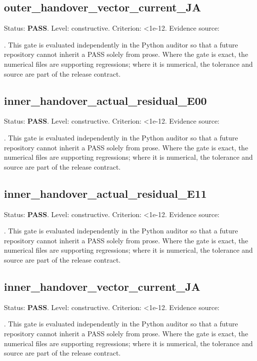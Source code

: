 \documentclass[11pt,a4paper,oneside]{book}
\begin{document}
\subsection{outer\_handover\_vector\_current\_JA}
Status: \textbf{PASS}. Level: constructive. Criterion: <1e-12. Evidence source:\par\noindent{}. This gate is evaluated independently in the Python auditor so that a future repository cannot inherit a PASS solely from prose. Where the gate is exact, the numerical files are supporting regressions; where it is numerical, the tolerance and source are part of the release contract.\par

\subsection{inner\_handover\_actual\_residual\_E00}
Status: \textbf{PASS}. Level: constructive. Criterion: <1e-12. Evidence source:\par\noindent{}. This gate is evaluated independently in the Python auditor so that a future repository cannot inherit a PASS solely from prose. Where the gate is exact, the numerical files are supporting regressions; where it is numerical, the tolerance and source are part of the release contract.\par

\subsection{inner\_handover\_actual\_residual\_E11}
Status: \textbf{PASS}. Level: constructive. Criterion: <1e-12. Evidence source:\par\noindent{}. This gate is evaluated independently in the Python auditor so that a future repository cannot inherit a PASS solely from prose. Where the gate is exact, the numerical files are supporting regressions; where it is numerical, the tolerance and source are part of the release contract.\par

\subsection{inner\_handover\_vector\_current\_JA}
Status: \textbf{PASS}. Level: constructive. Criterion: <1e-12. Evidence source:\par\noindent{}. This gate is evaluated independently in the Python auditor so that a future repository cannot inherit a PASS solely from prose. Where the gate is exact, the numerical files are supporting regressions; where it is numerical, the tolerance and source are part of the release contract.\par
\end{document}
